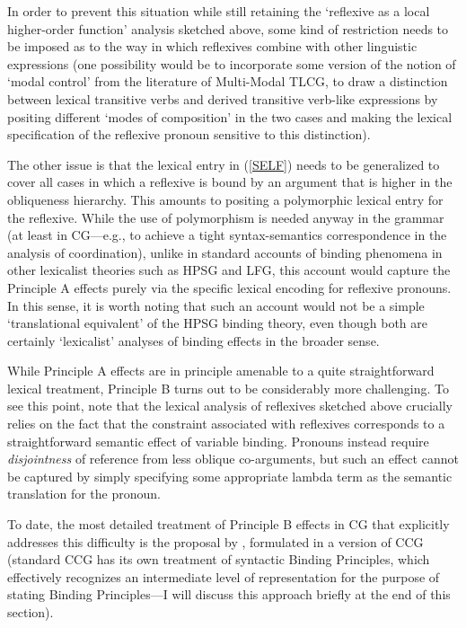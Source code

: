 \documentclass[output=paper]{langsci/langscibook}
\begin{document}
In order to prevent this situation while still retaining the
`reflexive as a local higher-order function' analysis sketched above,
some kind of restriction needs to be imposed as to the way in which
reflexives combine with other linguistic expressions (one possibility
would be to incorporate some version of the notion of `modal control'
from the literature of Multi-Modal TLCG, to draw a distinction between
lexical transitive verbs and derived transitive verb-like expressions
by positing different `modes of composition' in the two cases and
making the lexical specification of the reflexive pronoun sensitive to
this distinction).

The other issue is that the lexical entry in (\ref{SELF}) needs to be
generalized to cover all cases in which a reflexive is bound by an
argument that is higher in the obliqueness hierarchy. This amounts to
positing a polymorphic lexical entry for the reflexive. While the use
of polymorphism is needed anyway in the grammar (at least in CG---e.g.,
to achieve a tight syntax-semantics correspondence in the analysis of
coordination), unlike in standard accounts of binding phenomena in
other lexicalist theories such as HPSG and LFG, this account would
capture the Principle A effects purely via the specific lexical
encoding for reflexive pronouns. In this sense, it is worth noting
that such an account would not be a simple `translational equivalent'
of the HPSG binding theory, even though both are certainly
`lexicalist' analyses of binding effects in the broader sense.

While Principle A effects are in principle amenable to a quite
straightforward lexical treatment, Principle B turns out to be
considerably more challenging. To see this point, note that the
lexical analysis of reflexives sketched above crucially relies on the
fact that the constraint associated with reflexives corresponds to a
straightforward semantic effect of variable binding. Pronouns instead
require \emph{disjointness} of reference from less oblique co-arguments, but
such an effect cannot be captured by simply specifying some
appropriate lambda term as the semantic translation for the pronoun.

To date, the most detailed treatment of Principle B effects in CG that
explicitly addresses this difficulty is the proposal by \citet{jacobson07},
formulated in a version of CCG (standard CCG has its own treatment of
syntactic Binding Principles, which effectively recognizes an
intermediate level of representation for the purpose of stating
Binding Principles---I will discuss this approach briefly at the end
of this section).
\end{document}

